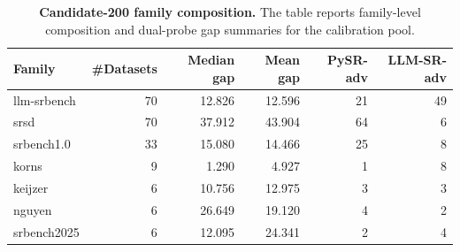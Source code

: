 \begin{table}
\caption{\textbf{Candidate-200 family composition.} The table reports family-level composition and dual-probe gap summaries for the calibration pool.}
\label{tab:table02_candidate200_family_summary}
\begin{tabular}{lrrrrr}
\toprule
\textbf{Family} & \textbf{\#Datasets} & \textbf{Median gap} & \textbf{Mean gap} & \textbf{PySR-adv} & \textbf{LLM-SR-adv} \\
\midrule
llm-srbench & 70 & 12.826 & 12.596 & 21 & 49 \\
srsd & 70 & 37.912 & 43.904 & 64 & 6 \\
srbench1.0 & 33 & 15.080 & 14.466 & 25 & 8 \\
korns & 9 & 1.290 & 4.927 & 1 & 8 \\
keijzer & 6 & 10.756 & 12.975 & 3 & 3 \\
nguyen & 6 & 26.649 & 19.120 & 4 & 2 \\
srbench2025 & 6 & 12.095 & 24.341 & 2 & 4 \\
\bottomrule
\end{tabular}
\end{table}
